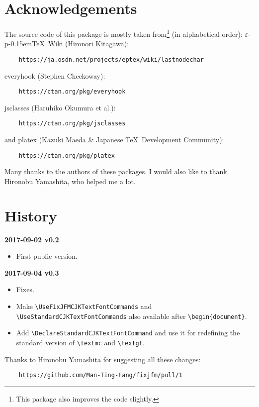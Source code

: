 \documentclass[a4paper]{article}
\newcommand\NormalSans{\normalfont\sffamily}
\newcommand\pkg[1]{{\protect\NormalSans#1}}
\newcommand\pTeX{p\kern-0.15em\TeX}
\newcommand\e{\ensuremath{\varepsilon}}
\newcommand\epTeX{\e-\pTeX}
\newenvironment{history}[1]%
  {\noindent\textbf{#1}\nopagebreak\relax\begin{itemize}}%
  {\end{itemize}}
\begin{document}
\section{Acknowledgements}

The source code of this package is mostly taken from\footnote{This package also
improves the code slightly.} (in alphabetical order):
\epTeX\ Wiki (Hironori Kitagawa):
\begin{verbatim}
    https://ja.osdn.net/projects/eptex/wiki/lastnodechar
\end{verbatim}
\pkg{everyhook} (Stephen Checkoway):
\begin{verbatim}
    https://ctan.org/pkg/everyhook
\end{verbatim}
\pkg{jsclasses} (Haruhiko Okumura et al.):
\begin{verbatim}
    https://ctan.org/pkg/jsclasses
\end{verbatim}
and \pkg{platex} (Kazuki Maeda \& Japanese \TeX\ Development Community):
\begin{verbatim}
    https://ctan.org/pkg/platex
\end{verbatim}
Many thanks to the authors of these packages. I would also like to thank
Hironobu Yamashita, who helped me a lot.

\section{History}

\begin{history}{2017-09-02 v0.2}
\item First public version.
\end{history}

\begin{history}{2017-09-04 v0.3}
\item Fixes.
\item Make \verb|\UseFixJFMCJKTextFontCommands| and
  \verb|\UseStandardCJKTextFontCommands| also available after
  \verb|\begin{document}|.
\item Add \verb|\DeclareStandardCJKTextFontCommand| and use it for redefining
  the standard version of \verb|\textmc| and \verb|\textgt|.
\end{history}
Thanks to Hironobu Yamashita for suggesting all these changes:
\begin{verbatim}
    https://github.com/Man-Ting-Fang/fixjfm/pull/1
\end{verbatim}
\end{document}
